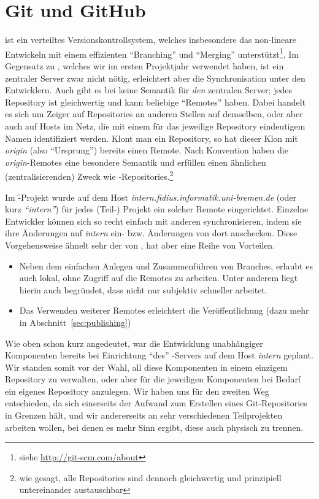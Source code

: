 \section{Git und GitHub}
\authors{\DM}{\DE \and \WF \and \LM \and \MW \and \JF}

 ist ein verteiltes Versionskontrollsystem, welches insbesondere das
non-lineare Entwickeln mit einem effizienten \enquote{Branching} und
\enquote{Merging} unterstützt\footnote{siehe \zB
  \url{http://git-scm.com/about}}. Im Gegensatz zu , welches wir
im ersten Projektjahr verwendet haben, ist ein zentraler Server zwar nicht
nötig, erleichtert aber die Synchronisation unter den Entwicklern. Auch gibt
es bei  keine Semantik für \textit{den} zentralen Server; jedes Repository
ist gleichwertig und kann beliebige \enquote{Remotes} haben. Dabei handelt es
sich um Zeiger auf Repositories an anderen Stellen auf demselben, oder aber
auch auf Hosts im Netz, die mit einem für das jeweilige Repository eindeutigem
Namen identifiziert werden. Klont man ein Repository, so hat dieser Klon mit
\textit{origin} (also \enquote{Ursprung}) bereits einen Remote. Nach Konvention
haben die \textit{origin}-Remotes eine besondere Semantik und erfüllen einen
ähnlichen (zentralisierenden) Zweck wie -Repositories.\footnote{wie
gesagt, alle Repositories sind dennoch gleichwertig und prinzipiell
untereinander austauschbar}

Im \f-Projekt wurde auf dem Host
\textit{intern.fidius.informatik.uni-bremen.de} (oder kurz \textit{\enquote{intern}})
für jedes (Teil-) Projekt ein solcher Remote eingerichtet. Einzelne Entwickler
können sich so recht einfach mit anderen synchronisieren, indem sie ihre
Änderungen auf \textit{intern} ein- bzw. Änderungen von dort auschecken. Diese
Vorgehensweise ähnelt sehr der von , hat aber eine Reihe von
Vorteilen.

\begin{itemize}
  \item Neben dem einfachen Anlegen und Zusammenführen von Branches, erlaubt es
       auch lokal, ohne Zugriff auf die Remotes zu arbeiten. Unter anderem
      liegt hierin auch begründet, dass  nicht nur subjektiv schneller
      arbeitet.
  \item Das Verwenden weiterer Remotes erleichtert die Veröffentlichung
      (dazu mehr in Abschnitt~\ref{sec:publishing})
\end{itemize}

Wie oben schon kurz angedeutet, war die Entwicklung unabhängiger Komponenten
bereits bei Einrichtung \enquote{des} -Servers auf dem Host \textit{intern}
geplant. Wir standen somit vor der Wahl, all diese Komponenten in einem
einzigem Repository zu verwalten, oder aber für die jeweiligen Komponenten bei
Bedarf ein eigenes Repository anzulegen. Wir haben uns für den zweiten Weg entschieden,
da sich einerseits der Aufwand zum Erstellen eines Git-Repositories in Grenzen hält,
und wir andererseits an sehr verschiedenen Teilprojekten arbeiten wollen, bei denen
es mehr Sinn ergibt, diese auch physisch zu trennen.

